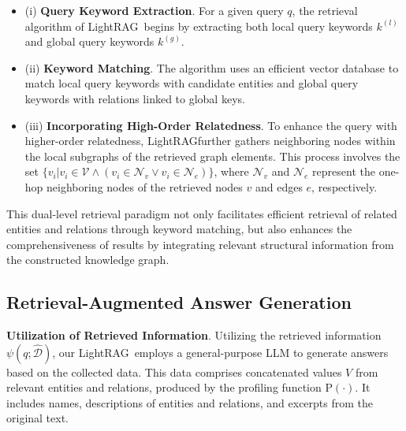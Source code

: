 \documentclass{article} %
\def\model{LightRAG}
\begin{document}
\begin{itemize}[leftmargin=*]

\item (i) \textbf{Query Keyword Extraction}. For a given query $q$, the retrieval algorithm of \model\ begins by extracting both local query keywords $k^{(l)}$ and global query keywords $k^{(g)}$.

\item (ii) \textbf{Keyword Matching}. The algorithm uses an efficient vector database to match local query keywords with candidate entities and global query keywords with relations linked to global keys.

\item (iii) \textbf{Incorporating High-Order Relatedness}. To enhance the query with higher-order relatedness, \model further gathers neighboring nodes within the local subgraphs of the retrieved graph elements. This process involves the set $\{v_i | v_i \in \mathcal{V} \land (v_i \in \mathcal{N}_v \lor v_i \in \mathcal{N}_e)\}$, where $\mathcal{N}_v$ and $\mathcal{N}_e$ represent the one-hop neighboring nodes of the retrieved nodes $v$ and edges $e$, respectively.

\end{itemize}

This dual-level retrieval paradigm not only facilitates efficient retrieval of related entities and relations through keyword matching, but also enhances the comprehensiveness of results by integrating relevant structural information from the constructed knowledge graph.


\subsection{Retrieval-Augmented Answer Generation}
\textbf{Utilization of Retrieved Information}. Utilizing the retrieved information $\psi(q;\hat{\mathcal{D}})$, our \model\ employs a general-purpose LLM to generate answers based on the collected data. This data comprises concatenated values $V$ from relevant entities and relations, produced by the profiling function $\text{P}(\cdot)$. It includes names, descriptions of entities and relations, and excerpts from the original text.
\end{document}
